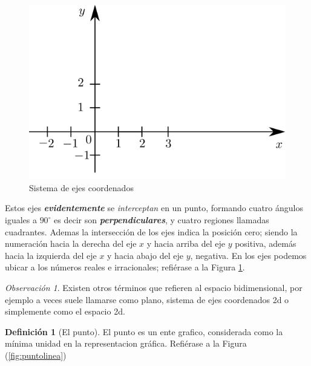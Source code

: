 \documentclass[16pt,]{krantz}
\theoremstyle{definition}
\newtheorem{definition}{Definición}[chapter]
\theoremstyle{definition}
\theoremstyle{definition}
\theoremstyle{definition}
\theoremstyle{remark}
\newtheorem*{remark}{Observación}
\begin{document}
\begin{figure}[!ht]

{\centering \includegraphics{ejes} 

}

\caption{Sistema de ejes coordenados}\label{fig:2d}
\end{figure}

Estos ejes \textbf{\emph{evidentemente}} se \emph{interceptan} en un punto, formando cuatro ángulos iguales a \(90^\circ\) es decir son \textbf{\emph{perpendiculares}}, y cuatro regiones llamadas cuadrantes. Ademas la intersección de los ejes indica la posición cero; siendo la numeración hacia la derecha del eje \(x\) y hacia arriba del eje \(y\) positiva, además hacia la izquierda del eje \(x\) y hacia abajo del eje \(y\), negativa. En los ejes podemos ubicar a los números reales e irracionales; refiérase a la Figura \ref{fig:2d}.

\begin{remark}
{}Existen otros términos que refieren al espacio bidimensional, por ejemplo a veces suele llamarse como plano, sistema de ejes coordenados 2d o simplemente como el espacio 2d.
\end{remark}

\begin{definition}[El punto]
\protect\hypertarget{def:punto}{}{\label{def:punto} {} }El punto es un ente grafico, considerada como la mínima unidad en la representacion gráfica. Refiérase a la Figura (\ref{fig:puntolinea})
\end{definition}
\end{document}

